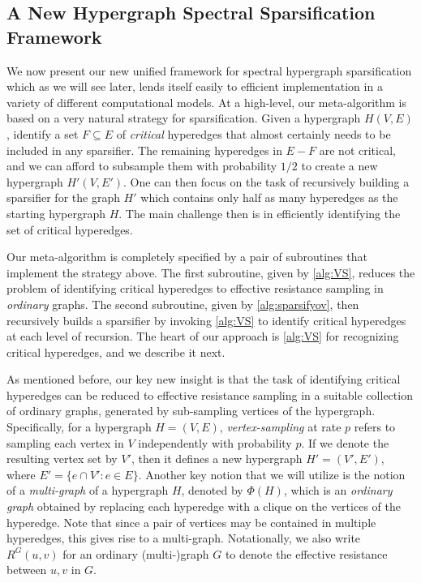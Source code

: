 \documentclass{article}
\begin{document}
\subsection{A New Hypergraph Spectral Sparsification Framework}\label{sec:metaalgoov}

We now present our new unified framework for spectral hypergraph sparsification which as we will see later, lends itself easily to efficient implementation in a variety of different computational models. At a high-level, our meta-algorithm is based on a very natural strategy for sparsification. Given a hypergraph $H(V,E)$, identify a set $F \subseteq E$ of {\em critical} hyperedges that almost certainly needs to be included in any sparsifier. The remaining hyperedges in $E - F$ are not critical, and we can afford to subsample them with probability $1/2$ to create a new hypergraph $H'(V,E')$. 
One can then focus on the task of recursively building a sparsifier for the graph $H'$ which contains only half as many hyperedges as the starting hypergraph $H$. 
The main challenge then is in efficiently identifying the set of critical hyperedges.

Our meta-algorithm is completely specified by a pair of subroutines that implement the strategy above. The first subroutine, given by \cref{alg:VS}, reduces the problem of identifying critical hyperedges to effective resistance sampling in {\em ordinary} graphs. The second subroutine, given by \cref{alg:sparsifyov}, then recursively builds a sparsifier by invoking \cref{alg:VS} to identify critical hyperedges at each level of recursion. The heart of our approach is \cref{alg:VS} for recognizing critical hyperedges, and we describe it next.

As mentioned before, our key new insight is that the task of identifying critical hyperedges can be reduced to effective resistance sampling in a suitable collection of ordinary graphs, generated by sub-sampling vertices of the hypergraph.
Specifically, for a hypergraph $H = (V, E)$, \textit{vertex-sampling} at rate $p$ refers to sampling each vertex in $V$ independently with probability $p$. If we denote the resulting vertex set by $V'$, then it defines a new hypergraph $H' = (V', E')$, where $E' = \{e \cap V': e \in E \}$. Another key notion that we will utilize is 
the notion of a \textit{multi-graph} of a hypergraph $H$, denoted by $\Phi(H)$, which is an {\em ordinary graph} obtained by replacing each hyperedge with a clique on the vertices of the hyperedge. Note that since a pair of vertices may be contained in multiple hyperedges, this gives rise to a multi-graph.
Notationally, we also write $R^G(u,v)$ for an ordinary (multi-)graph $G$ to denote the effective
resistance between $u,v$ in $G$.
\end{document}

